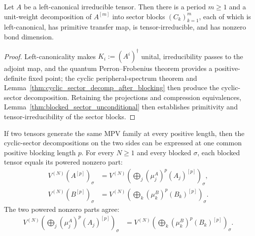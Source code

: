 \begin{lemma}%
    \label{thm:cyclic_sector_decomp_irr_tp_prim_irr}
    \leanok
    Let $A$ be a left-canonical irreducible tensor. Then there is a period
    $m\ge1$ and a unit-weight decomposition of $A^{[m]}$ into sector blocks
    $(C_k)_{k=1}^m$, each of which is left-canonical, has primitive transfer map,
    is tensor-irreducible, and has nonzero bond dimension.
\end{lemma}

\begin{proof}\leanok
    Left-canonicality makes $K_i:=(A^i)^\dagger$ unital, irreducibility passes
    to the adjoint map, and the quantum Perron--Frobenius theorem provides a
    positive-definite fixed point; the cyclic peripheral-spectrum theorem and
    Lemma~\ref{thm:cyclic_sector_decomp_after_blocking} then produce the
    cyclic-sector decomposition. Retaining the projections and compression
    equivalences, Lemma~\ref{thm:blocked_sector_unconditional} then
    establishes primitivity and tensor-irreducibility of the sector blocks.
\end{proof}


\begin{lemma}%
    \label{thm:ft_after_blocking_common_length_common_sector_theorem}
    \leanok
    If two tensors generate the same MPV family at every positive length, then
    the cyclic-sector decompositions on the two sides can be expressed at one
    common positive blocking length $p$. For every $N\ge1$ and every blocked
    $\sigma$, each blocked tensor equals its powered nonzero part:
    \begin{align}
        V^{(N)}(A^{[p]})_\sigma
         & =
        V^{(N)}\!\left(\bigoplus_j(\mu_j^A)^p(A_j)^{[p]}\right)_\sigma,
        \label{eq:canonical_powered_part_a} \\
        V^{(N)}(B^{[p]})_\sigma
         & =
        V^{(N)}\!\left(\bigoplus_k(\mu_k^B)^p(B_k)^{[p]}\right)_\sigma.
        \label{eq:canonical_powered_part_b}
    \end{align}
    The two powered nonzero parts agree:
    \begin{align}
        V^{(N)}\!\left(\bigoplus_j(\mu_j^A)^p(A_j)^{[p]}\right)_\sigma
         & =
        V^{(N)}\!\left(\bigoplus_k(\mu_k^B)^p(B_k)^{[p]}\right)_\sigma.
        \label{eq:canonical_powered_parts_equal}
    \end{align}
\end{lemma}

